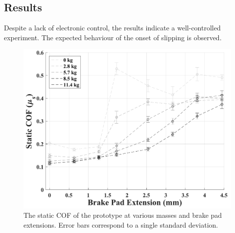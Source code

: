 \documentclass [12pt,letterpaper]{report}
\begin{document}
\subsection{Results}

Despite a lack of electronic control, the results indicate a well-controlled experiment. The expected behaviour of the onset of slipping is observed.

\begin{figure}[tpb]
  \centering
  \includegraphics[scale=0.6]{fig/COF_vs_BPE}
  \caption{The static COF of the prototype at various masses and brake pad extensions. Error bars correspond to a single standard deviation.}
  \label{cof_vs_bpe}
\end{figure}
\end{document}
